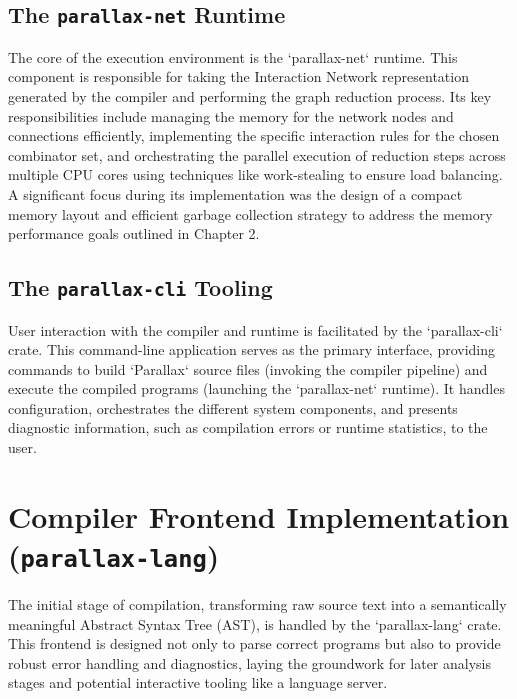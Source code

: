 \subsection{The \texttt{parallax-net} Runtime} %
The core of the execution environment is the `parallax-net` runtime. This component is responsible for taking the Interaction Network representation generated by the compiler and performing the graph reduction process. Its key responsibilities include managing the memory for the network nodes and connections efficiently, implementing the specific interaction rules for the chosen combinator set, and orchestrating the parallel execution of reduction steps across multiple CPU cores using techniques like work-stealing to ensure load balancing. A significant focus during its implementation was the design of a compact memory layout and efficient garbage collection strategy to address the memory performance goals outlined in Chapter 2.

\subsection{The \texttt{parallax-cli} Tooling} %
User interaction with the compiler and runtime is facilitated by the `parallax-cli` crate. This command-line application serves as the primary interface, providing commands to build `Parallax` source files (invoking the compiler pipeline) and execute the compiled programs (launching the `parallax-net` runtime). It handles configuration, orchestrates the different system components, and presents diagnostic information, such as compilation errors or runtime statistics, to the user.


\section{Compiler Frontend Implementation (\texttt{parallax-lang})} %

The initial stage of compilation, transforming raw source text into a semantically meaningful Abstract Syntax Tree (AST), is handled by the `parallax-lang` crate. This frontend is designed not only to parse correct programs but also to provide robust error handling and diagnostics, laying the groundwork for later analysis stages and potential interactive tooling like a language server.


